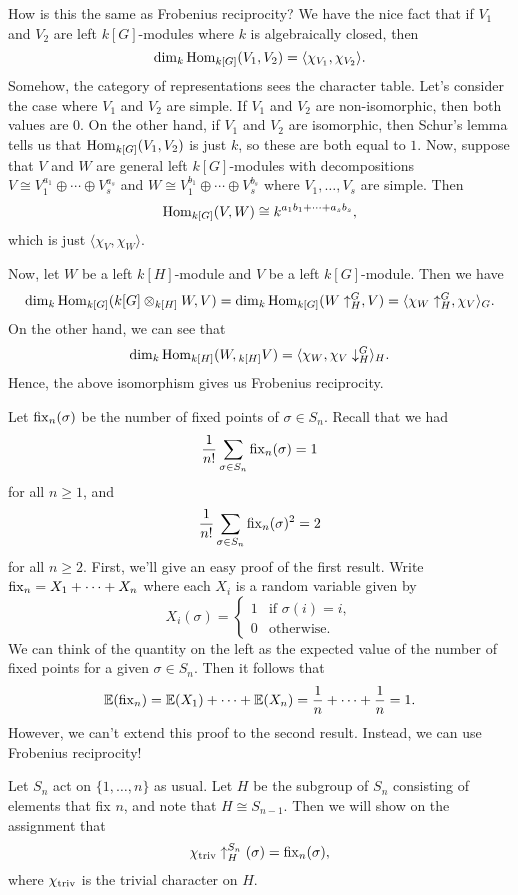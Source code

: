 How is this the same as Frobenius reciprocity? We have the nice fact that 
if $V_1$ and $V_2$ are left $k[G]$-modules where $k$ is algebraically closed, then 
\[ \dim_k \operatorname{Hom}_{k[G]}(V_1, V_2) = \langle \chi_{V_1}, \chi_{V_2} \rangle. \] 
Somehow, the category of representations sees the character table. Let's 
consider the case where $V_1$ and $V_2$ are simple. If $V_1$ and $V_2$ are 
non-isomorphic, then both values are $0$. On the other hand, if $V_1$ and $V_2$
are isomorphic, then Schur's lemma tells us that $\operatorname{Hom}_{k[G]}(V_1, V_2)$ is 
just $k$, so these are both equal to $1$. Now, suppose that $V$ and $W$ 
are general left $k[G]$-modules with decompositions   
$V \cong V_1^{a_1} \oplus \cdots \oplus V_s^{a_s}$ and $W \cong V_1^{b_1} 
\oplus \cdots \oplus V_s^{b_s}$ where $V_1, \dots, V_s$ are simple. Then 
\[ \operatorname{Hom}_{k[G]}(V, W) \cong k^{a_1b_1 + \cdots + a_sb_s}, \] 
which is just $\langle \chi_V, \chi_W \rangle$. 

Now, let $W$ be a left $k[H]$-module and $V$ be a left $k[G]$-module. Then we have 
\[ \dim_k \operatorname{Hom}_{k[G]} (k[G] \otimes_{k[H]} W, V) = 
\dim_k \operatorname{Hom}_{k[G]} (W \uparrow_H^G, V) = \langle \chi_W \uparrow_H^G, \chi_V \rangle_G. \] 
On the other hand, we can see that 
\[ \dim_k \operatorname{Hom}_{k[H]} (W, {}_{k[H]} V) = \langle \chi_W, \chi_V \downarrow_H^G \rangle_H. \] 
Hence, the above isomorphism gives us Frobenius reciprocity. 

Let $\operatorname{fix}_n(\sigma)$ be the number of fixed points of $\sigma \in S_n$. 
Recall that we had 
\[ \frac{1}{n!} \sum_{\sigma \in S_n} \operatorname{fix}_n(\sigma) = 1 \] 
for all $n \geq 1$, and 
\[ \frac{1}{n!} \sum_{\sigma \in S_n} \operatorname{fix}_n(\sigma)^2 = 2 \] 
for all $n \geq 2$. First, we'll give an easy proof of the first result. 
Write $\operatorname{fix}_n = X_1 + \cdots + X_n$ where each $X_i$ is a random variable 
given by 
\[ X_i(\sigma) = \begin{cases} 
    1 & \text{if } \sigma(i) = i, \\ 
    0 & \text{otherwise.} 
\end{cases} \] 
We can think of the quantity on the left as the expected value of the number 
of fixed points for a given $\sigma \in S_n$. Then it follows that 
\[ \mathbb{E}(\operatorname{fix}_n) = \mathbb{E}(X_1) + \cdots + \mathbb{E}(X_n) = \frac1n + \cdots + \frac1n = 1. \] 
However, we can't extend this proof to the second result. Instead, we can use 
Frobenius reciprocity!

\begin{remark}{}
    Let $S_n$ act on $\{1, \dots, n\}$ as usual. Let $H$ be the subgroup of 
    $S_n$ consisting of elements that fix $n$, and note that $H \cong S_{n-1}$. 
    Then we will show on the assignment that  
    \[ \chi_{\operatorname{triv}} \uparrow_H^{S_n} (\sigma) = \operatorname{fix}_n(\sigma), \] 
    where $\chi_{\operatorname{triv}}$ is the trivial character on $H$. 
\end{remark}

